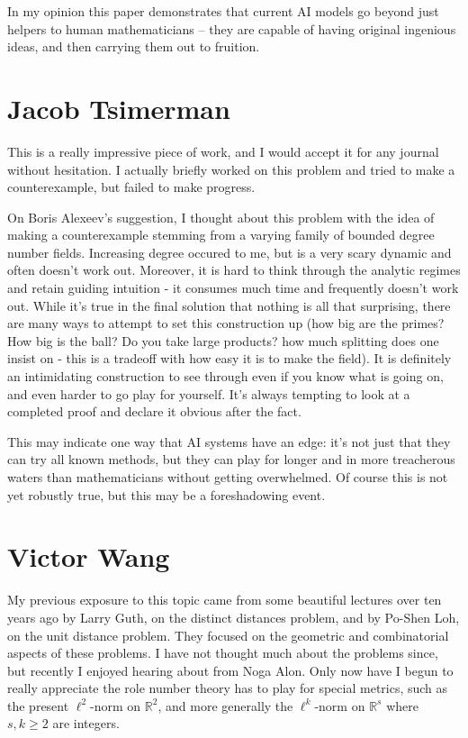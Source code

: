 \documentclass[11pt,reqno]{amsart}
\numberwithin{equation}{section}
\theoremstyle{definition}
\theoremstyle{remark}
\newcommand{\R}{\mathbb{R}}
\begin{document}
In my opinion this paper demonstrates that current AI models go beyond just helpers to human mathematicians -- they are capable of having original ingenious ideas, and then carrying them out to fruition. 


\section{Jacob Tsimerman}

This is a really impressive piece of work, and I would accept it for any journal without hesitation. I actually briefly worked on this problem and tried to make a counterexample, but failed to make progress.

On Boris Alexeev's suggestion, I thought about this problem with the idea of making a counterexample stemming from a varying family of bounded degree number fields. Increasing degree occured to me, but is a very scary dynamic and often doesn't work out. Moreover, it is hard to think through the analytic regimes and retain guiding intuition - it consumes much time and frequently doesn't work out. While it's true in the final solution that nothing is all that surprising, there are many ways to attempt to set this construction up (how big are the primes?  How big is the ball? Do you take large products?  how much splitting does one insist on - this is a tradeoff with how easy it is to make the field). It is definitely an intimidating construction to see through even if you know what is going on, and even harder to go play for yourself. It's always tempting to look at a completed proof and declare it obvious after the fact. 

This may indicate one way that AI systems have an edge: it's not just that they can try all known methods, but they can play for longer and in more treacherous waters than mathematicians  without getting overwhelmed. Of course this is not yet robustly true, but this may be a foreshadowing event.

\section{Victor Wang}

My previous exposure to this topic came from some beautiful lectures over ten years ago by Larry Guth, on the distinct distances problem, and by Po-Shen Loh, on the unit distance problem.
They focused on the geometric and combinatorial aspects of these problems.
I have not thought much about the problems since, but recently I enjoyed hearing about \cite{Alon2025Typical} from Noga Alon.
Only now have I begun to really appreciate the role number theory has to play for special metrics, such as the present $\ell^2$-norm on $\R^2$, and more generally the $\ell^k$-norm on $\R^s$ where $s,k\ge 2$ are integers.
\end{document}
